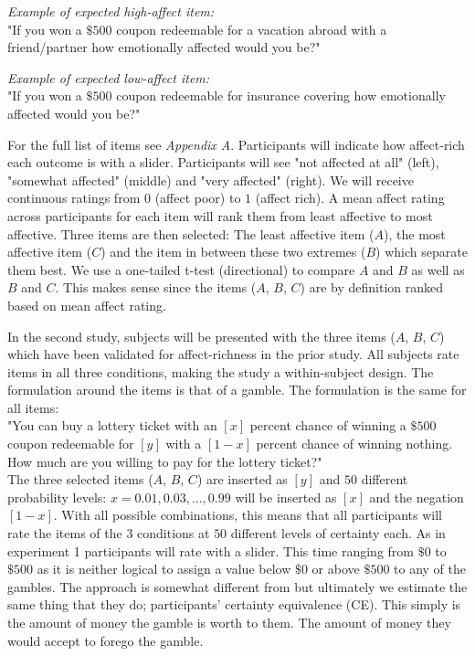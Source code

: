 \documentclass[12pt]{article}
\begin{document}
\emph{Example of expected high-affect item:} \\
"If you won a $\$500$ coupon redeemable
for a vacation abroad with a friend/partner
how emotionally
affected would you be?"

\vspace{3mm}

\emph{Example of expected low-affect item:} \\
"If you won a $\$500$ coupon redeemable
for insurance covering how emotionally
affected would you be?"

\vspace{3mm}

For the full list of items see \emph{Appendix A}.
Participants
will indicate how affect-rich
each outcome is with a slider. Participants will
see "not affected at all" (left),
"somewhat affected" (middle)
and "very affected" (right).
We will receive continuous ratings from $0$
(affect poor) to $1$ (affect rich). A mean
affect rating across participants for each
item will rank them from least affective to
most affective. Three items are
then selected: The least affective item ($A$),
the most affective item ($C$) and the item in
between these two extremes ($B$) which separate them
best. We use a one-tailed t-test
(directional) to compare $A$ and  $B$
as well as  $B$ and  $C$. This makes sense
since the items ($A$,  $B$,  $C$)
are by definition ranked based on mean
affect rating.

\vspace{3mm}

In the second study, subjects will be presented
with the three items ($A$,  $B$,  $C$)
which have been validated
for affect-richness in the prior study. All
subjects rate items in all three conditions,
making the study a within-subject design.
The formulation
around the items is that of a gamble.
The formulation is the same
for all items: \\

"You can buy a lottery ticket with an $[x]$
percent chance of winning a $\$500$ coupon
redeemable for $[y]$ with a $[1-x]$ percent
chance of winning nothing. How much are you
willing to pay for the lottery ticket?" \\

The three selected items
($A$,  $B$,  $C$) are inserted as $[y]$
and $50$ different probability levels:
$x = 0.01, 0.03, \ldots, 0.99$ will be
inserted as $[x]$ and the negation $[1-x]$.
With all
possible combinations, this means that
all participants will rate the items of
the $3$ conditions
at $50$ different levels of certainty each.
As in experiment 1 participants will rate
with a slider. This time ranging from
$\$0$ to $\$500$ as it is neither logical
to assign a value below $\$0$ or above
$\$500$ to any of the gambles.
The approach is somewhat
different from \textcite{gonzalez1999shape}
but ultimately we estimate the same thing that
they do; participants' certainty equivalence (CE).
This simply is the amount of money the
gamble is worth to them. The amount of money
they would accept to forego the gamble. \\
\end{document}
